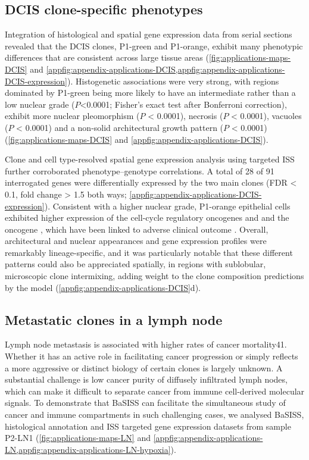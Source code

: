 \subsection{DCIS clone-specific phenotypes}

Integration of histological and spatial gene expression data from serial sections revealed that the DCIS clones, P1-green and P1-orange, exhibit many phenotypic differences that are consistent across large tissue areas (\cref{fig:applications-maps-DCIS} and \cref{appfig:appendix-applications-DCIS,appfig:appendix-applications-DCIS-expression}). Histogenetic associations were very strong, with regions dominated by P1-green being more likely to have an intermediate rather than a low nuclear grade ($P$<0.0001; Fisher’s exact test after Bonferroni correction), exhibit more nuclear pleomorphism ($P$ < 0.0001), necrosis ($P$ < 0.0001), vacuoles ($P$ < 0.0001) and a non-solid architectural growth pattern ($P$ < 0.0001) (\cref{fig:applications-maps-DCIS} and \cref{appfig:appendix-applications-DCIS}).

Clone and cell type-resolved spatial gene expression analysis using targeted \ac{ISS} further corroborated phenotype–genotype correlations. A total of 28 of 91 interrogated genes were differentially expressed by the two main clones (\ac{FDR} < 0.1, fold change > 1.5 both ways; \cref{appfig:appendix-applications-DCIS-expression}). Consistent with a higher nuclear grade, P1-orange epithelial cells exhibited higher expression of the cell-cycle regulatory oncogenes  and  and the oncogene , which have been linked to adverse clinical outcome . Overall, architectural and nuclear appearances and gene expression profiles were remarkably lineage-specific, and it was particularly notable that these different patterns could also be appreciated spatially, in regions with sublobular, microscopic clone intermixing, adding weight to the clone composition predictions by the model (\cref{appfig:appendix-applications-DCIS}d).

\subsection{Metastatic clones in a lymph node}

Lymph node metastasis is associated with higher rates of cancer mortality41. Whether it has an active role in facilitating cancer progression or simply reflects a more aggressive or distinct biology of certain clones is largely unknown. A substantial challenge is low cancer purity of diffusely infiltrated lymph nodes, which can make it difficult to separate cancer from immune cell-derived molecular signals. To demonstrate that \ac{BaSISS} can facilitate the simultaneous study of cancer and immune compartments in such challenging cases, we analysed \ac{BaSISS}, histological annotation and \ac{ISS} targeted gene expression datasets from sample P2-LN1 (\cref{fig:applications-maps-LN} and \cref{appfig:appendix-applications-LN,appfig:appendix-applications-LN-hypoxia}).

